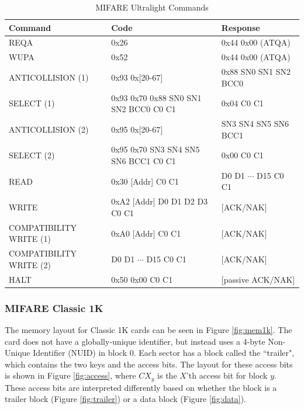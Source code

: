 \documentclass[fleqn,10pt]{SelfArx} %
\begin{document}
\begin{table}[h]
\centering
\caption{MIFARE Ultralight Commands}
\label{tab:cmdul}
\begin{tabular}{|l|l|l|}
\hline
\rowcolor{headcolor}
{\bf Command} 		&     {\bf Code} 						&    {\bf Response} 		\\ \hline
REQA 				&     0x26      						&    0x44  0x00 (ATQA) 		\\ \hline
WUPA 			&     0x52      						&    0x44  0x00 (ATQA) 		\\ \hline
ANTICOLLISION (1)  	&     0x93 0x[20-67]     					&    0x88 SN0 SN1 SN2 BCC0       	\\ \hline
SELECT (1) 			&     0x93 0x70 0x88 SN0 SN1 SN2 BCC0 C0 C1       	&    0x04 C0 C1			\\ \hline
ANTICOLLISION (2)		&     0x95 0x[20-67]				       	&    SN3 SN4 SN5 SN6 BCC1        	\\ \hline
SELECT (2) 			&     0x95 0x70 SN3 SN4 SN5 SN6 BCC1 C0 C1       	&    0x00 C0 C1			\\ \hline
READ 				&     0x30 [Addr] C0 C1					&    D0 D1 $\cdots$ D15 C0 C1    	\\ \hline
WRITE 			&     0xA2 [Addr] D0 D1 D2 D3 C0 C1       		&   [ACK/NAK]		         	\\ \hline
COMPATIBILITY WRITE (1)&     0xA0 [Addr] C0 C1 					&   [ACK/NAK]			\\ \hline
COMPATIBILITY WRITE (2)&     D0 D1 $\cdots$ D15 C0 C1				&   [ACK/NAK]			\\ \hline
HALT				&     0x50 0x00 C0 C1				       	&   [passive ACK/NAK]             	\\ \hline
\end{tabular}
\end{table}

\newpage
\subsubsection{MIFARE Classic 1K \cite{classic1k}}
\label{app:classic1k}

The memory layout for Classic 1K cards can be seen in Figure \ref{fig:mem1k}. The card does not have a globally-unique identifier, but instead uses a 4-byte Non-Unique Identifier (NUID) in block 0. Each sector has a block called the ``trailer", which contains the two keys and the access bits. The layout for these access bits is shown in Figure \ref{fig:access}, where $CX_y$ is the $X$'th access bit for block $y$. These access bits are interpreted differently based on whether the block is a trailer block (Figure \ref{fig:trailer}) or a data block (Figure \ref{fig:data}).
\end{document}
